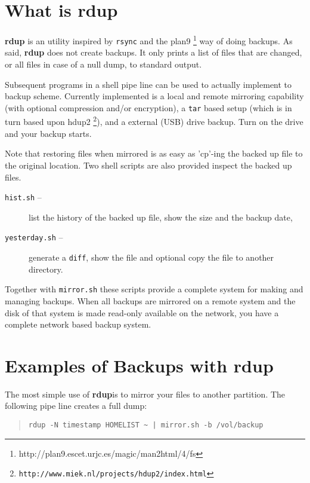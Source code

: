 \documentclass{article}
\newcommand{\rdup}{\textbf{rdup}}
\newcommand{\cmd}[1]{\texttt{#1}}
\newcommand{\url}[1]{\texttt{#1}}
\begin{document}
\section*{What is \rdup}
\rdup{} is an utility inspired by \cmd{rsync} and the 
plan9 \footnote{http://plan9.escet.urjc.es/magic/man2html/4/fs} 
way of doing backups. As said, \rdup{} does not create backups. It only
prints a list of files that are changed, or all files in case of a null
dump, to standard output.

Subsequent programs in a shell pipe line can be used to actually
implement to backup scheme. Currently implemented is a local and
remote mirroring capability (with optional compression and/or
encryption), a \cmd{tar} based setup (which is in turn based upon
hdup2 \footnote{\url{http://www.miek.nl/projects/hdup2/index.html}}), 
and a external (USB) drive backup. Turn on the drive and your backup starts.

Note that restoring files when mirrored is as easy as 'cp'-ing the
backed up file to the original location. Two shell scripts are
also provided inspect the backed up files. 
\begin{description}
        \item[\cmd{hist.sh} --]{
                list the history of the backed up file, show the size
                and the backup date,}
        \item[\cmd{yesterday.sh} --]{
                generate a \cmd{diff}, show the file and optional copy 
                the file to another directory.}
\end{description}

Together with \cmd{mirror.sh} these scripts provide a complete system
for making and managing backups. When all backups are mirrored on a
remote system and the disk of that system is made read-only available on 
the network, you have a complete network based backup system.

\section*{Examples of Backups with rdup}
The most simple use of \rdup is to mirror your files to
another partition. The following pipe line creates a
full dump:
\begin{quote}
\begin{verbatim}
rdup -N timestamp HOMELIST ~ | mirror.sh -b /vol/backup
\end{verbatim}
\end{quote}
\end{document}
